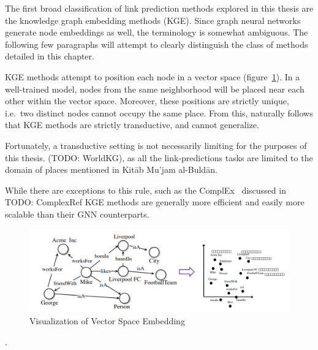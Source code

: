 The first broad classification of link prediction methods explored in this thesis are the knowledge graph embedding methods (KGE).
Since graph neural networks generate node embeddings as well, the terminology is somewhat ambiguous.
The following few paragraphs will attempt to clearly distinguish the class of methods detailed in this chapter.

KGE methods attempt to position each node in a vector space (figure~\ref{fig:vec-space-vis}).
In a well-trained model, nodes from the same neighborhood will be placed near each other within the vector space.
Moreover, these positions are strictly unique, i.e.\ two distinct nodes cannot occupy the same place.
From this, naturally follows that KGE methods are strictly transductive, and cannot generalize.

Fortunately, a transductive setting is not necessarily limiting for the purposes of this thesis.
(TODO: WorldKG), as all the link-predictions tasks are limited
to the domain of places mentioned in Kitāb Mu'jam al-Buldān.

While there are exceptions to this rule, such as the ComplEx~\cite{ComplEx} discussed in TODO: ComplexRef
KGE methods are generally more efficient and easily more scalable than their GNN counterparts.
\begin{figure}[h] %
    \centering %
    \includegraphics[width=1\linewidth]{figures/vector-space} %
    \caption{Visualization of Vector Space Embedding~\cite{KGETutorial}} %
    \label{fig:vec-space-vis} %
\end{figure}.
